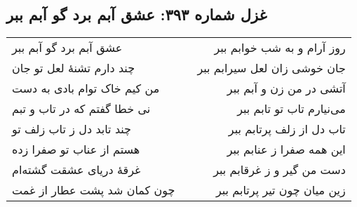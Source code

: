 \begin{center}
\section*{غزل شماره ۳۹۳: عشق آبم برد گو آبم ببر}
\label{sec:393}
\begin{longtable}{l p{0.5cm} r}
عشق آبم برد گو آبم ببر
&&
روز آرام و به شب خوابم ببر
\\
چند دارم تشنهٔ لعل تو جان
&&
جان خوشی زان لعل سیرابم ببر
\\
من کیم خاک توام بادی به دست
&&
آتشی در من زن و آبم ببر
\\
نی خطا گفتم که در تاب و تبم
&&
می‌نیارم تاب تو تابم ببر
\\
چند تابد دل ز تاب زلف تو
&&
تاب دل از زلف پرتابم ببر
\\
هستم از عناب تو صفرا زده
&&
این همه صفرا ز عنابم ببر
\\
غرقهٔ دریای عشقت گشته‌ام
&&
دست من گیر و ز غرقابم ببر
\\
چون کمان شد پشت عطار از غمت
&&
زین میان چون تیر پرتابم ببر
\\
\end{longtable}
\end{center}
